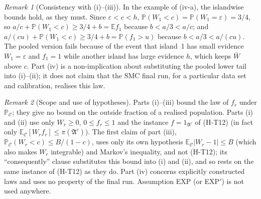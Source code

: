 \documentclass[11pt]{article}
\theoremstyle{remark}
\newtheorem{remark}{Remark}
\newcommand{\Pc}{\mathbb{P}_{\mathcal C}}
\newcommand{\Ec}{\mathbb{E}_{\mathcal C}}
\newcommand{\A}{\mathfrak{A}}
\begin{document}
\begin{remark}[Consistency with (i)--(iii)]
In the example of (iv-a), the islandwise bounds hold, as they must. Since $\varepsilon<c<h$,
$\mathbb P(W_1<c)=\mathbb P(W_1=\varepsilon)=3/4$, so $a/c+\mathbb P(W_1<c)\ge3/4+b=\mathbb E f_1$ because
$b<a/3<a/c$; and $a/(cu)+\mathbb P(W_1<c)\ge 3/4+b=\mathbb P(f_1>u)$ because $b<a/3<a/(cu)$. The pooled version fails
because of the event that island~1 has small evidence $W_1=\varepsilon$ and $f_1=1$ while another island has large
evidence $h$, which keeps $\bar W$ above $c$. Part (iv) is a non-implication about substituting the pooled lower
tail into (i)--(ii); it does not claim that the SMC final run, for a particular data set and calibration, realises
this law.
\end{remark}

\begin{remark}[Scope and use of hypotheses]
Parts (i)--(iii) bound the law of $f_r$ under $\Pc$; they give no bound on the outside fraction of a realised
population. Parts (i) and (ii) use only $W_r\ge0$, $0\le f_r\le1$ and the instance $f=1_{\A^c}$ of (H-T12) (in
fact only $\Ec[W_rf_r]\le\pi(\A^c)$). The first claim of part (iii), $\Pc(W_r<c)\le B/(1-c)$, uses only its own hypothesis
$\Ec|W_r-1|\le B$ (which also makes $W_r$ integrable) and Markov's inequality, and not (H-T12); its
``consequently'' clause substitutes this bound into (i) and (ii), and so rests on the same instance of (H-T12) as
they do. Part (iv) concerns explicitly constructed laws
and uses no property of the final run. Assumption EXP (or EXP$'$) is not used anywhere.
\end{remark}
\end{document}
